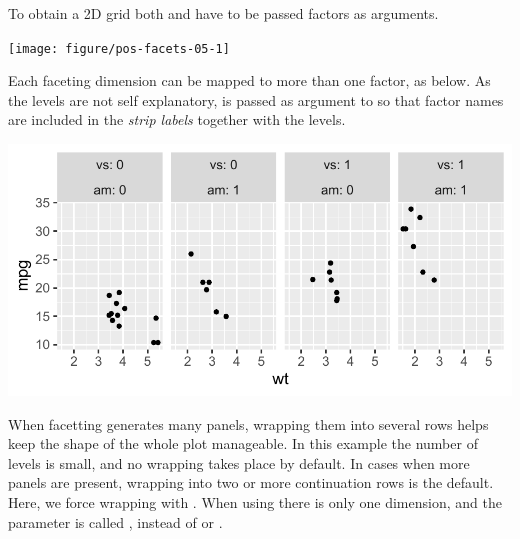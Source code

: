 \documentclass[krantz2]{krantz}\usepackage{knitr}
\begin{document}
To obtain a 2D grid both  and  have to be passed factors as arguments.

\begin{knitrout}\footnotesize
{}\color{fgcolor}\begin{kframe}
\begin{alltt}
 \hlopt{+} \hlstd{(} \hlstd{=}   \hlstd{=}   
\end{alltt}
\end{kframe}

{\centering \texttt{[image: figure/pos-facets-05-1]} 

}


\end{knitrout}



Each faceting dimension can be mapped to more than one factor, as below. As the levels are not self explanatory,  is passed as argument to  so that factor names are included in the \emph{strip labels} together with the levels.

\begin{knitrout}\footnotesize
{}\color{fgcolor}\begin{kframe}
\begin{alltt}
 \hlopt{+} \hlstd{(} \hlstd{=}   
\end{alltt}
\end{kframe}

{\centering \includegraphics[width=.7\textwidth]{figure/pos-facets-07-1} 

}


\end{knitrout}

When facetting generates many panels, wrapping them into several rows helps keep the shape of the whole plot manageable. In this example the number of levels is small, and no wrapping takes place by default. In cases when more panels are present, wrapping into two or more continuation rows is the default. Here, we force wrapping with . When using  there is only one dimension, and the parameter is called , instead of  or .
\end{document}

